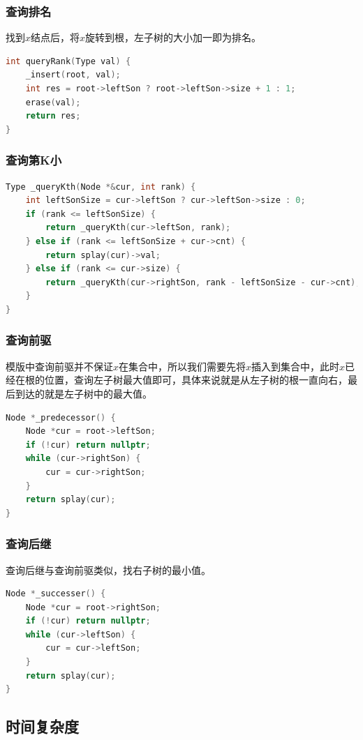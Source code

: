 \documentclass[utf8]{ctexbeamer}
\begin{document}
    \begin{frame}[fragile]
        \frametitle{查询排名}
        找到$x$结点后，将$x$旋转到根，左子树的大小加一即为排名。
        \begin{lstlisting}[language=c++]
int queryRank(Type val) {
    _insert(root, val);
    int res = root->leftSon ? root->leftSon->size + 1 : 1;
    erase(val);
    return res;
}
        \end{lstlisting}
    \end{frame}

    \begin{frame}[fragile]
        \frametitle{查询第K小}
        \begin{lstlisting}[language=c++]
Type _queryKth(Node *&cur, int rank) {
    int leftSonSize = cur->leftSon ? cur->leftSon->size : 0;
    if (rank <= leftSonSize) {
        return _queryKth(cur->leftSon, rank);
    } else if (rank <= leftSonSize + cur->cnt) {
        return splay(cur)->val;
    } else if (rank <= cur->size) {
        return _queryKth(cur->rightSon, rank - leftSonSize - cur->cnt);
    }
}
        \end{lstlisting}    
    \end{frame}

    \begin{frame}[fragile]
        \frametitle{查询前驱}
        模版中查询前驱并不保证$x$在集合中，所以我们需要先将$x$插入到集合中，此时$x$已经在根的位置，查询左子树最大值即可，具体来说就是从左子树的根一直向右，最后到达的就是左子树中的最大值。
        \begin{lstlisting}[language=c++]
Node *_predecessor() {
    Node *cur = root->leftSon;
    if (!cur) return nullptr;
    while (cur->rightSon) {
        cur = cur->rightSon;
    }
    return splay(cur);
}
        \end{lstlisting}
    \end{frame}

    \begin{frame}[fragile]
        \frametitle{查询后继}
        查询后继与查询前驱类似，找右子树的最小值。
        \begin{lstlisting}[language=c++]
Node *_successer() {
    Node *cur = root->rightSon;
    if (!cur) return nullptr;
    while (cur->leftSon) {
        cur = cur->leftSon;
    }
    return splay(cur);
}
        \end{lstlisting}
    \end{frame}

    \subsection{时间复杂度}
\end{document}
